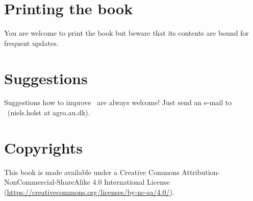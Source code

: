 \section{Printing the book}
You are welcome to print the book but beware that its contents are bound for frequent updates. 

\section{Suggestions}
Suggestions how to improve \US\ are always welcome! Just send an e-mail to  \USS\ (niels.holst at agro.au.dk).


\section{Copyrights}
This book is made available under a Creative Commons Attribution-NonCommercial-ShareAlike 4.0 International License (\url{https://creativecommons.org/licenses/by-nc-sa/4.0/}).
